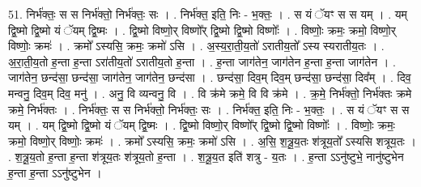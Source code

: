 \documentclass[17pt]{extarticle}
\begin{document}
51. निर्भ॑क्तः॒ स स निर्भ॑क्तो॒ निर्भ॑क्तः॒ सः । . निर्भ॑क्त॒ इति॒ निः - भ॒क्तः॒ । . स यं ॅयꣳ स स यम् । . यम् द्वि॒ष्मो द्वि॒ष्मो यं ॅयम् द्वि॒ष्मः । . द्वि॒ष्मो विष्णो॒र् विष्णो᳚र् द्वि॒ष्मो द्वि॒ष्मो विष्णोः᳚ । . विष्णोः॒ क्रमः॒ क्रमो॒ विष्णो॒र् विष्णोः॒ क्रमः॑ । . क्रमो᳚ ऽस्यसि॒ क्रमः॒ क्रमो॑ ऽसि । . अ॒स्य॒रा॒ती॒य॒तो॑ ऽरातीय॒तो᳚ ऽस्य स्यरातीय॒तः । . अ॒रा॒ती॒य॒तो ह॒न्ता ह॒न्ता ऽरा॑तीय॒तो॑ ऽरातीय॒तो ह॒न्ता । . ह॒न्ता जाग॑तेन॒ जाग॑तेन ह॒न्ता ह॒न्ता जाग॑तेन । . जाग॑तेन॒ छन्द॑सा॒ छन्द॑सा॒ जाग॑तेन॒ जाग॑तेन॒ छन्द॑सा । . छन्द॑सा॒ दिव॒म् दिव॒म् छन्द॑सा॒ छन्द॑सा॒ दिव᳚म् । . दिव॒ मन्वनु॒ दिव॒म् दिव॒ मनु॑ । . अनु॒ वि व्यन्वनु॒ वि । . वि क्र॑मे क्रमे॒ वि वि क्र॑मे । . क्र॒मे॒ निर्भ॑क्तो॒ निर्भ॑क्तः क्रमे क्रमे॒ निर्भ॑क्तः । . निर्भ॑क्तः॒ स स निर्भ॑क्तो॒ निर्भ॑क्तः॒ सः । . निर्भ॑क्त॒ इति॒ निः - भ॒क्तः॒ । . स यं ॅयꣳ स स यम् । . यम् द्वि॒ष्मो द्वि॒ष्मो यं ॅयम् द्वि॒ष्मः । . द्वि॒ष्मो विष्णो॒र् विष्णो᳚र् द्वि॒ष्मो द्वि॒ष्मो विष्णोः᳚ । . विष्णोः॒ क्रमः॒ क्रमो॒ विष्णो॒र् विष्णोः॒ क्रमः॑ । . क्रमो᳚ ऽस्यसि॒ क्रमः॒ क्रमो॑ ऽसि । . अ॒सि॒ श॒त्रू॒य॒तः श॑त्रूय॒तो᳚ ऽस्यसि शत्रूय॒तः । . श॒त्रू॒य॒तो ह॒न्ता ह॒न्ता श॑त्रूय॒तः श॑त्रूय॒तो ह॒न्ता । . श॒त्रू॒य॒त इति॑ शत्रु - य॒तः । . ह॒न्ता ऽऽनु॑ष्टुभे॒ नानु॑ष्टुभेन ह॒न्ता ह॒न्ता ऽऽनु॑ष्टुभेन । \newline
\end{document}
